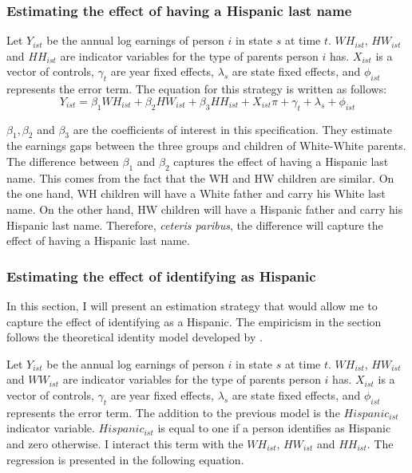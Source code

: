 \documentclass[12pt, fullpage]{article}
\begin{document}
\subsubsection{Estimating the effect of having a Hispanic last name}

Let $Y_{ist}$ be the annual log earnings of person $i$ in state $s$ at time $t$. $WH_{ist}$, $HW_{ist}$ and $HH_{ist}$ are indicator variables for the type of parents person $i$ has. $X_{ist}$ is a vector of controls, $\gamma_{t}$ are year fixed effects, $\lambda_{s}$ are state fixed effects, and $\phi_{ist}$ represents the error term. The equation for this strategy is written as follows:
\begin{equation} \label{eq:1a}
Y_{ist} = \beta_{1} WH_{ist} +\beta_{2} HW_{ist} + \beta_{3} HH_{ist} + X_{ist} \pi + \gamma_{t} + \lambda_s + \phi_{ist}
\end{equation}

$\beta_{1}, \beta_{2}$ and $\beta_{3}$ are the coefficients of interest in this specification. They estimate the earnings gaps between the three groups and children of White-White parents. The difference between $\beta_{1}$ and $\beta_{2}$ captures the effect of having a Hispanic last name. This comes from the fact that the WH and HW children are similar. On the one hand, WH children will have a White father and carry his White last name. On the other hand, HW children will have a Hispanic father and carry his Hispanic last name. Therefore, \textit{ceteris paribus}, the difference will capture the effect of having a Hispanic last name.

\subsubsection{Estimating the effect of identifying as Hispanic}

In this section, I will present an estimation strategy that would allow me to capture the effect of identifying as a Hispanic. The empiricism in the section follows the theoretical identity model developed by \citet{akerlof2000economics}. 

Let $Y_{ist}$ be the annual log earnings of person $i$ in state $s$ at time $t$. $WH_{ist}$, $HW_{ist}$ and $WW_{ist}$ are indicator variables for the type of parents person $i$ has. $X_{ist}$ is a vector of controls, $\gamma_{t}$ are year fixed effects, $\lambda_s$ are state fixed effects, and $\phi_{ist}$ represents the error term. The addition to the previous model is the $Hispanic_{ist}$ indicator variable. $Hispanic_{ist}$ is equal to one if a person identifies as Hispanic and zero otherwise. I interact this term with the $WH_{ist}$, $HW_{ist}$ and $HH_{ist}$.  The regression is presented in the following equation.
\end{document}
